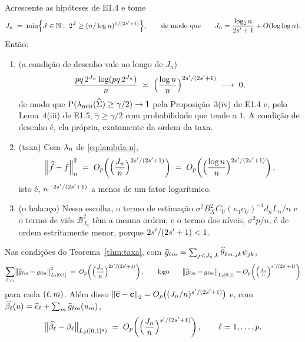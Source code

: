 \documentclass[11pt,a4paper]{article}
\newcommand{\lmin}{\lambda_{\min}}
\newcommand{\gtil}{\widetilde{\gamma}}
\begin{document}
\begin{theorem}\label{thm:taxa}
Acrescente as hipóteses de E1.4 e tome
\begin{equation}
  \label{eq:Jn}
  J_{n} \;=\; \min\Bigl\{J \in \mathbb{N} :\;
  2^{J} \ge (n/\log n)^{1/(2s'+1)}\Bigr\},
  \qquad\text{de modo que}\qquad
  J_{n} = \frac{\log_{2}n}{2s'+1} + O(\log\log n).
\end{equation}
Então:
\begin{enumerate}[label=\textup{(\roman*)}, leftmargin=*]
  \item \textup{(a condição de desenho vale ao longo de $J_{n}$)}
    \[
      \frac{pq\,2^{J_{n}}\log(pq\,2^{J_{n}})}{n}
      \;\asymp\; \Bigl(\frac{\log n}{n}\Bigr)^{2s'/(2s'+1)}
      \;\longrightarrow\; 0 ,
    \]
    de modo que $\Prob(\lmin(\Gramhat) \ge \gamma/2) \to 1$ pela
    Proposição~3(iv) de E1.4 e, pelo Lema~4(iii) de E1.5,
    $\gtil \ge \gamma/2$ com probabilidade que tende a $1$. A condição de
    desenho é, ela própria, exatamente da ordem da taxa.
  \item \textup{(taxa)} Com $\lambda_{n}$ de \eqref{eq:lambda-n},
    \[
      \left\lVert \widehat f - f \right\rVert_{n}^{2}
      \;=\; O_{p}\!\left(\Bigl(\frac{J_{n}}{n}\Bigr)^{2s'/(2s'+1)}\right)
      \;=\; O_{p}\!\left(\Bigl(\frac{\log n}{n}\Bigr)^{2s'/(2s'+1)}\right),
    \]
    isto é, $n^{-2s'/(2s'+1)}$ a menos de um fator logarítmico.
  \item \textup{(o balanço)} Nessa escolha, o termo de estimação
    $\sigma^{2}B_{X}^{2}C_{U}(\kappa_{1}c_{U})^{-1}d_{n}L_{n}/n$ e o termo de
    viés $\mathcal{B}_{J_{n}}^{2}$ têm a mesma ordem, e o termo dos níveis,
    $\sigma^{2}p/n$, é de ordem estritamente menor, porque
    $2s'/(2s'+1) < 1$.
\end{enumerate}
\end{theorem}

\begin{corollary}
\label{cor:componentes-taxa}
Nas condições do Teorema~\ref{thm:taxa}, com
$\widehat g_{\ell m} = \sum_{j<J_{n},k}
\widehat{\theta}_{\ell m,jk}\psi_{jk}$,
\[
  \sum_{\ell,m}\bigl\lVert \widehat g_{\ell m} - g_{\ell m}
  \bigr\rVert_{L_{2}[0,1]}^{2}
  \;=\; O_{p}\!\left(\Bigl(\frac{J_{n}}{n}\Bigr)^{2s'/(2s'+1)}\right),
  \qquad\text{logo}\qquad
  \bigl\lVert \widehat g_{\ell m} - g_{\ell m}\bigr\rVert_{L_{2}[0,1]}
  = O_{p}\!\left(\Bigl(\tfrac{J_{n}}{n}\Bigr)^{s'/(2s'+1)}\right)
\]
para cada $(\ell,m)$. Além disso
$\left\lVert \widehat{\mathbf{c}} - \mathbf{c} \right\rVert_{2} = O_{p}\bigl((J_{n}/n)^{s'/(2s'+1)}\bigr)$ e, com
$\widehat{\beta_{\ell}}(u) = \widehat{c}_{\ell} + \sum_{m}\widehat g_{\ell m}(u_{m})$,
\[
  \bigl\lVert\widehat{\beta_{\ell}} - \beta_{\ell}\bigr\rVert_{L_{2}([0,1]^{q})}
  \;=\; O_{p}\!\left(\Bigl(\frac{J_{n}}{n}\Bigr)^{s'/(2s'+1)}\right),
  \qquad \ell = 1,\dots,p .
\]
\end{corollary}
\end{document}

